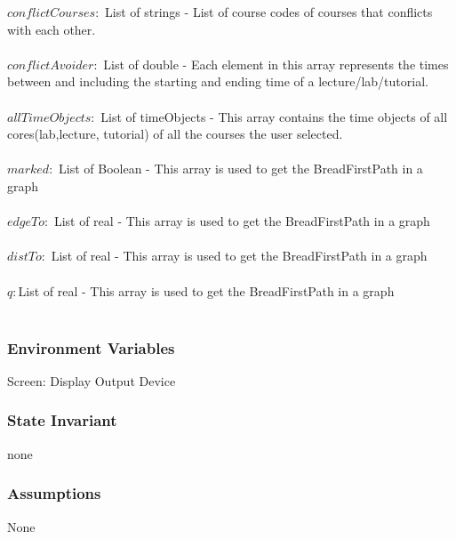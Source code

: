 \documentclass[11pt, oneside]{article}
\begin{document}
$ conflictCourses:$ List of strings - List of course codes of courses that conflicts with each other.\\ \\

$ conflictAvoider:$ List of double - Each element in this array represents the times between and including the starting and ending time of a lecture/lab/tutorial.\\ \\

$ allTimeObjects:$ List of timeObjects - This array contains the time objects of all cores(lab,lecture, tutorial) of all the courses the user selected.\\ \\

$ marked: $ List of Boolean - This array is used to get the BreadFirstPath in a graph\\ \\
$ edgeTo:$ List of real - This array is used to get the BreadFirstPath in a graph\\ \\
$ distTo:$ List of real - This array is used to get the BreadFirstPath in a graph\\ \\
$ q:$List of real - This array is used to get the BreadFirstPath in a graph\\ \\

\subsubsection*{Environment Variables}
Screen: Display Output Device \\

\subsubsection* {State Invariant}
none
\subsubsection* {Assumptions}
None
\end{document}
